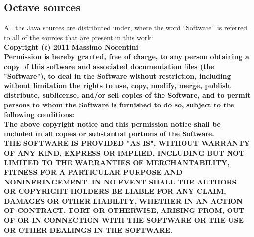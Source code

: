 \subsection*{Octave sources}
All the Java sources are distributed under, where the word ``Software'' is
referred to all of the sources that are present in this work: \\
\textbf{
Copyright (c) 2011 Massimo Nocentini\\
Permission is hereby granted, free of charge, to any person obtaining a copy of
this software and associated documentation files (the "Software"), to deal in 
the Software without restriction, including without limitation the rights to 
use, copy, modify, merge, publish, distribute, sublicense, and/or sell 
copies of the Software, and to permit persons to whom the Software is furnished 
to do so, subject to the following conditions:\\
The above copyright notice and this permission notice shall be included in all 
copies or substantial portions of the Software.\\
THE SOFTWARE IS PROVIDED "AS IS", WITHOUT WARRANTY OF ANY KIND, EXPRESS OR 
IMPLIED, INCLUDING BUT NOT LIMITED TO THE WARRANTIES OF MERCHANTABILITY, 
FITNESS FOR A PARTICULAR PURPOSE AND NONINFRINGEMENT. IN NO EVENT SHALL THE 
AUTHORS OR COPYRIGHT HOLDERS BE LIABLE FOR ANY CLAIM, DAMAGES OR OTHER LIABILITY, 
WHETHER IN AN ACTION OF CONTRACT, TORT OR OTHERWISE, ARISING FROM, OUT OF OR IN 
CONNECTION WITH THE SOFTWARE OR THE USE OR OTHER DEALINGS IN THE SOFTWARE.
}
